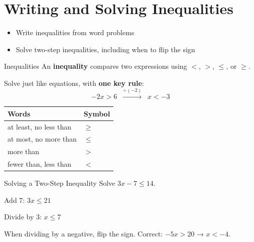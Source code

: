 \section{Writing and Solving Inequalities}

\begin{learningGoals}
\begin{itemize}
    \item Write inequalities from word problems
    \item Solve two-step inequalities, including when to flip the sign
\end{itemize}
\end{learningGoals}

\begin{conceptBox}{Inequalities}
An \textbf{inequality} compares two expressions using $<$, $>$, $\leq$, or $\geq$.

Solve just like equations, with \textbf{one key rule}:
$$-2x > 6 \;\;\xrightarrow{\div (-2)}\;\; x < -3$$
\begin{center}
\begin{tabular}{l l}
    \textbf{Words} & \textbf{Symbol} \\
    \hline
    at least, no less than & $\geq$ \\
    at most, no more than & $\leq$ \\
    more than & $>$ \\
    fewer than, less than & $<$ \\
\end{tabular}
\end{center}
\end{conceptBox}

\begin{workedExample}{Solving a Two-Step Inequality}
Solve $3x - 7 \leq 14$.

Add $7$: $3x \leq 21$

Divide by $3$: $x \leq 7$
\end{workedExample}

\begin{errorBox}
When dividing by a negative, flip the sign.
Correct: $-5x > 20$ → $x < -4$.
\end{errorBox}

